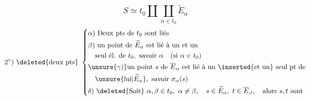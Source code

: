 \[
S\simeq t_0\amalg\coprod_{\alpha\in t_0}\widetilde E_\alpha \tag*{$1^\circ$)}
\]
\[
2^\circ)\ \deleted{\text{deux pts}}\ \left\{\begin{aligned}
&\alpha)\ \text{Deux pts de }t_0\text{ sont liés}\\
&\beta)\ \text{un point de }\widetilde E_\alpha\text{ est lié à un et un}\\
&\quad\text{seul él. de }t_0,\ \text{savoir }\alpha\quad(\text{si }\alpha\in t_0)\\
&\unsure{\gamma) }\text{un point }s\text{ de }\overline E_\alpha\text{ est lié à un }\inserted{\text{et un}}\text{ seul pt de}\\
&\quad\unsure{\text{lui}|\widetilde E_\alpha},\ \text{savoir }\sigma_\alpha(s)\\
&\delta)\ \deleted{\text{Soit}}\ \alpha,\beta\in t_0,\ \alpha\ne\beta,\quad s\in\widetilde E_\alpha,\ t\in\overline E_\beta,\quad\text{alors }s,t\text{ sont}
\end{aligned}\right.
\]
